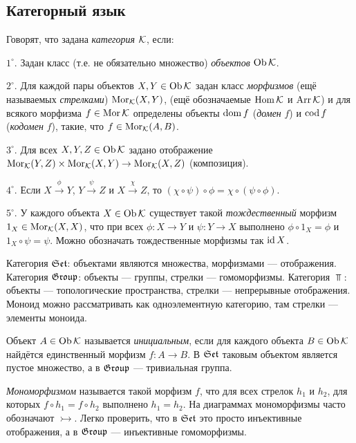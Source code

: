 \documentclass[10pt,a4paper]{article}%
\begin{document}
\subsection{Категорный язык}

Говорят, что задана \emph{категория} $\mathcal{K}$, если:
\par $1^\circ$. Задан класс (т.е. не обязательно множество)
{\em объектов} $\operatorname{Ob}\mathcal{K}$.
\par $2^\circ$. Для каждой пары объектов $X,Y\in\operatorname{Ob}\mathcal{K}$ задан
класс {\em морфизмов} (ещё называемых {\em
стрелками}) $\operatorname{Mor}_{\mathcal{K}}(X,Y)$, (ещё обозначаемые
$\operatorname{Hom}\mathcal{K}$ и $\operatorname{Arr}\mathcal{K}$) и для всякого морфизма $f\in\operatorname{Mor}\mathcal{K}$
определены объекты $\operatorname{dom} f$ ({\em домен} $f$) и $\operatorname{cod}
f$ ({\em кодомен} $f$), такие, что
$f\in\operatorname{Mor}_{\mathcal{K}}(A,B)$.
\par $3^\circ$. Для всех $X,Y,Z\in\operatorname{Ob}\mathcal{K}$ задано отображение $\operatorname{Mor}_{\mathcal{K}}(Y,Z)
\times\operatorname{Mor}_{\mathcal{K}}(X,Y)\rightarrow\operatorname{Mor}_{\mathcal{K}}(X,Z)$ (композиция).
\par $4^\circ$. Если $X\stackrel{\phi}\to Y$,
$Y\stackrel{\psi}\to Z$ и $X\stackrel{\chi}\to Z$, то
$(\chi\circ\psi)\circ\phi=\chi\circ(\psi\circ\phi)$.
\par $5^\circ$. У каждого объекта $X\in\operatorname{Ob}\mathcal{K}$ существует такой
{\em тождественный} морфизм
$1_X\in\operatorname{Mor}_{\mathcal{K}}(X,X)$, что при всех $\phi:X\to Y$ и $\psi:Y\to
X$ выполнено $\phi\circ 1_X=\phi$ и $1_X\circ\psi=\psi$. Можно
обозначать тождественные морфизмы так $\operatorname{id} X$.

\begin{example}
Категория $\mathfrak{Set}$: объектами являются
множества, морфизмами
--- отображения. Категория $\mathfrak{Group}$: объекты --- группы, стрелки
--- гомоморфизмы. Категория $\Top$: объекты --- топологические
пространства, стрелки --- непрерывные отображения. Моноид можно
рассматривать как одноэлементную категорию, там стрелки ---
элементы моноида.
\end{example}

Объект $A\in\operatorname{Ob}\mathcal{K}$ называется {\em
инициальным}, если для каждого объекта
$B\in\operatorname{Ob}\mathcal{K}$ найдётся единственный морфизм $f:A\to B$. В $\mathfrak{Set}$
таковым объектом является пустое множество, а в $\mathfrak{Group}$
--- тривиальная группа.

{\em Мономорфизмом} называется такой морфизм
$f$, что для всех стрелок $h_1$ и $h_2$, для которых $f\circ
h_1=f\circ h_2$ выполнено $h_1=h_2$. На диаграммах мономорфизмы
часто обозначают $\rightarrowtail$. Легко проверить, что в $\mathfrak{Set}$
это просто инъективные отображения, а в $\mathfrak{Group}$ --- инъективные
гомоморфизмы.
\end{document}
